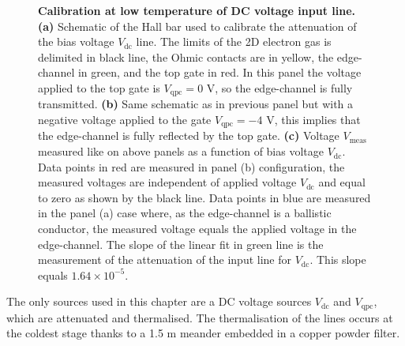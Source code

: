 \begin{figure}[hptb]
\begin{center}
\begin{tabular}{c c c c}
		\end{tabular}
	\end{center}
	
	\caption{\textbf{Calibration at low temperature of DC voltage input line.} \textbf{(a)} Schematic of the Hall bar used to calibrate the attenuation of the bias voltage $V_{\mathrm{dc}}$ line. The limits of the 2D electron gas is delimited in black line, the Ohmic contacts are in yellow, the edge-channel in green, and the top gate in red. In this panel the voltage applied to the top gate is $V_{\mathrm{qpc}} = 0$ V, so the edge-channel is fully transmitted. \textbf{(b)} Same schematic as in previous panel but with a negative voltage applied to the gate $V_{\mathrm{qpc}} = -4$ V, this implies that the edge-channel is fully reflected by the top gate. \textbf{(c)} Voltage $V_{\mathrm{meas}}$ measured like on above panels as a function of bias voltage $V_{\mathrm{dc}}$. Data points in red are measured in panel (b) configuration, the measured voltages are independent of applied voltage $V_{\mathrm{dc}}$ and equal to zero as shown by the black line. Data points in blue are measured in the panel (a) case where, as the edge-channel is a ballistic conductor, the measured voltage equals the applied voltage in the edge-channel. The slope of the linear fit in green line is the measurement of the attenuation of the input line for $V_{\mathrm{dc}}$. This slope equals $1.64 \times 10^{-5}$.}
	\label{fig: DC line gain}
\end{figure}


The only sources used in this chapter are a DC voltage sources $V_{\mathrm{dc}}$ and $V_{\mathrm{qpc}}$, which are attenuated and thermalised.
The thermalisation of the lines occurs at the coldest stage thanks to a 1.5 m meander embedded in a copper powder filter.

